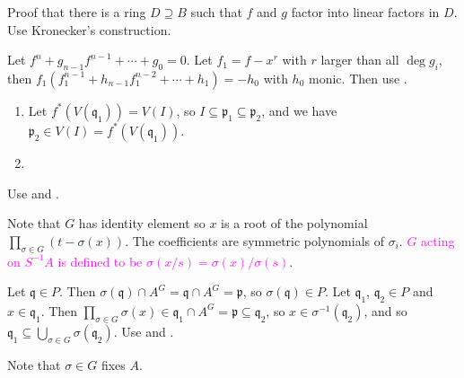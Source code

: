 \begin{exercise}\label{ex5.8}
	Proof that there is a ring $D\supseteq B$ such that $f$ and $g$ factor into linear factors in $D$. Use Kronecker's construction.
\end{exercise}

\begin{exercise}\label{ex5.9}
	Let $f^n+g_{n-1}f^{n-1}+\cdots+g_0=0$. Let $f_1=f-x^r$ with $r$ larger than all $\operatorname{deg}g_i$, then $f_1\left(f_1^{n-1}+h_{n-1}f_1^{n-2}+\cdots+h_1\right)=-h_0$ with $h_0$ monic. Then use .
\end{exercise}

\begin{exercise}\label{ex5.10}
	\begin{enumerate}
		\item[(a) $\Rightarrow$ (b)] Let $f^*(V(\mathfrak{q}_1))=V(I)$, so $I\subseteq\mathfrak{p}_1\subseteq\mathfrak{p}_2$, and we have $\mathfrak{p}_2\in V(I)=f^*(V(\mathfrak{q}_1))$.
		\item[(a') $\Rightarrow$ (c')] 
	\end{enumerate}
\end{exercise}

\begin{exercise}\label{ex5.11}
	Use  and .
\end{exercise}

\begin{exercise}\label{ex5.12}
	Note that $G$ has identity element so $x$ is a root of the polynomial $\prod_{\sigma\in G}\left(t-\sigma(x)\right)$. The coefficients are symmetric polynomials of $\sigma_i$. \textcolor{magenta}{$G$ acting on $S^{-1}A$ is defined to be $\sigma(x/s)=\sigma(x)/\sigma(s)$}.
\end{exercise}

\begin{exercise}\label{ex5.13}
	Let $\mathfrak{q}\in P$. Then $\sigma(\mathfrak{q})\cap A^G=\mathfrak{q}\cap A^G=\mathfrak{p}$, so $\sigma(\mathfrak{q})\in P$. Let $\mathfrak{q}_1$, $\mathfrak{q}_2\in P$ and $x\in\mathfrak{q}_1$. Then $\prod_{\sigma\in G}\sigma(x)\in\mathfrak{q}_1\cap A^G=\mathfrak{p}\subseteq\mathfrak{q}_2$, so $x\in\sigma^{-1}\left(\mathfrak{q}_2\right)$, and so $\mathfrak{q}_1\subseteq\bigcup_{\sigma\in G}\sigma\left(\mathfrak{q}_2\right)$. Use  and .
\end{exercise}

\begin{exercise}\label{ex5.14}
	Note that $\sigma\in G$ fixes $A$.
\end{exercise}

